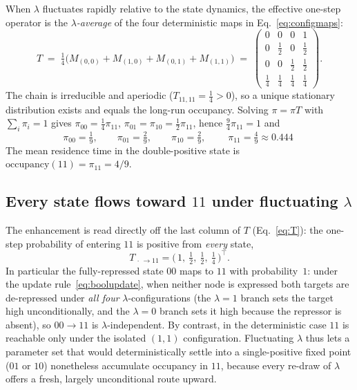 When $\lambda$ fluctuates rapidly relative to the state dynamics, the effective
one-step operator is the \emph{$\lambda$-average} of the four deterministic maps
in Eq.~\eqref{eq:configmaps}:
\begin{equation}
  T \;=\; \tfrac{1}{4}\bigl(M_{(0,0)}+M_{(1,0)}+M_{(0,1)}+M_{(1,1)}\bigr)
    \;=\;
    \begin{pmatrix}
      0 & 0 & 0 & 1\\[2pt]
      0 & \tfrac{1}{2} & 0 & \tfrac{1}{2}\\[2pt]
      0 & 0 & \tfrac{1}{2} & \tfrac{1}{2}\\[2pt]
      \tfrac{1}{4} & \tfrac{1}{4} & \tfrac{1}{4} & \tfrac{1}{4}
    \end{pmatrix}.
  \label{eq:T}
\end{equation}
The chain is irreducible and aperiodic ($T_{11,11}=\tfrac14>0$), so a unique
stationary distribution exists and equals the long-run occupancy. Solving
$\pi=\pi T$ with $\sum_i\pi_i=1$ gives $\pi_{00}=\tfrac14\pi_{11}$,
$\pi_{01}=\pi_{10}=\tfrac12\pi_{11}$, hence $\tfrac{9}{4}\pi_{11}=1$ and
\begin{equation}
  \pi_{00}=\tfrac{1}{9},\qquad
  \pi_{01}=\tfrac{2}{9},\qquad
  \pi_{10}=\tfrac{2}{9},\qquad
  \boxed{\;\pi_{11}=\tfrac{4}{9}\approx 0.444\;}
  \label{eq:piann}
\end{equation}
The mean residence time in the double-positive state is
$\mathrm{occupancy}(11)=\pi_{11}=4/9$.
 
\subsection{Every state flows toward $11$ under fluctuating $\lambda$}
\label{sec:column}
 
The enhancement is read directly off the last column of $T$
(Eq.~\eqref{eq:T}): the one-step probability of entering $11$ is positive from
\emph{every} state,
\begin{equation}
  T_{\,\cdot\,\to 11} = \bigl(\,1,\ \tfrac12,\ \tfrac12,\ \tfrac14\,\bigr)^{\!\top}.
\end{equation}
In particular the fully-repressed state $00$ maps to $11$ with probability~$1$:
under the update rule~\eqref{eq:boolupdate}, when neither node is expressed both
targets are de-repressed under \emph{all four} $\lambda$-configurations (the
$\lambda=1$ branch sets the target high unconditionally, and the $\lambda=0$
branch sets it high because the repressor is absent), so $00\!\to\!11$ is
$\lambda$-independent. By contrast, in the deterministic case $11$ is reachable
only under the isolated $(1,1)$ configuration. Fluctuating $\lambda$ thus lets a
parameter set that would deterministically settle into a single-positive fixed
point ($01$ or $10$) nonetheless accumulate occupancy in $11$, because every
re-draw of $\lambda$ offers a fresh, largely unconditional route upward.
 
